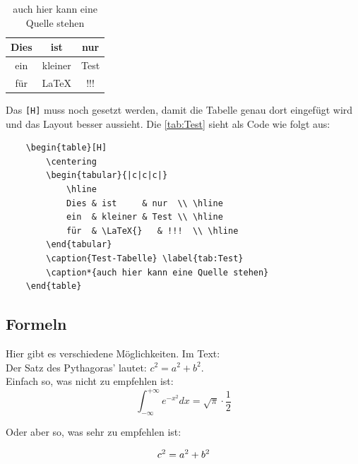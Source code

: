 \begin{table}[H]
	\centering
	\begin{tabular}{|c|c|c|}
		\hline
		Dies & ist     & nur  \\ \hline
		ein  & kleiner & Test \\ \hline
		für  & \LaTeX{}   & !!!  \\ \hline
	\end{tabular}
	\caption{Test-Tabelle} \label{tab:Test}
	\caption*{auch hier kann eine Quelle stehen}
\end{table}

Das \verb|[H]| muss noch gesetzt werden, damit die Tabelle genau dort eingefügt wird und das Layout besser aussieht. Die \autoref{tab:Test} sieht als Code wie folgt aus:

\begin{verbatim}
    \begin{table}[H]
        \centering
        \begin{tabular}{|c|c|c|}
            \hline
            Dies & ist     & nur  \\ \hline
            ein  & kleiner & Test \\ \hline
            für  & \LaTeX{}   & !!!  \\ \hline
        \end{tabular}
        \caption{Test-Tabelle} \label{tab:Test}
        \caption*{auch hier kann eine Quelle stehen}
    \end{table}
\end{verbatim}


\subsection{Formeln}

Hier gibt es verschiedene Möglichkeiten. Im Text:\\
Der Satz des Pythagoras' lautet: $c^2 = a^2 + b^2$. \\
Einfach so, was nicht zu empfehlen ist: \\
\[\label{eq:GaußschesFehlerintegral}
\int_{-\infty}^{+\infty} e^{-x^2} dx = \sqrt{\pi} \cdot \frac{1}{2}
\]

Oder aber so, was sehr zu empfehlen ist:

\begin{equation}
	\numberwithin{equation}{section}
	c^2 = a^2 + b^2 \label{eq:Pythagoras} \\
\end{equation}

